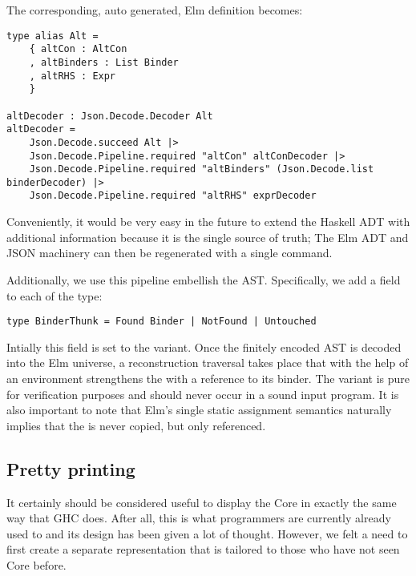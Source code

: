 The corresponding, auto generated, Elm definition becomes:

\begin{listing}[H]
\begin{verbatim}
type alias Alt =
    { altCon : AltCon
    , altBinders : List Binder
    , altRHS : Expr
    }

altDecoder : Json.Decode.Decoder Alt
altDecoder =
    Json.Decode.succeed Alt |>
    Json.Decode.Pipeline.required "altCon" altConDecoder |>
    Json.Decode.Pipeline.required "altBinders" (Json.Decode.list binderDecoder) |>
    Json.Decode.Pipeline.required "altRHS" exprDecoder
\end{verbatim}
\end{listing}

Conveniently, it would be very easy in the future to extend the Haskell ADT with additional information
because it is the single source of truth; The Elm ADT and JSON machinery can then be regenerated with a single command.

Additionally, we use this pipeline embellish the AST. Specifically, we add a field to each  of the type:

\begin{listing}[H]
\begin{verbatim}
type BinderThunk = Found Binder | NotFound | Untouched
\end{verbatim}
\end{listing}

Intially this field is set to the  variant. Once the finitely encoded AST is decoded into the 
Elm universe, a reconstruction traversal takes place that with the help of an environment strengthens the 
 with a reference to its binder. The  variant is pure for verification purposes
and should never occur in a sound input program. It is also important to note that Elm's single static assignment
semantics naturally implies that the  is never copied, but only referenced.


\subsection{Pretty printing}

It certainly should be considered useful to display the Core in exactly the same way that
GHC does. After all, this is what programmers are currently already used to and its design
has been given a lot of thought. However, we felt a need to first create a separate representation
that is tailored to those who have not seen Core before.

